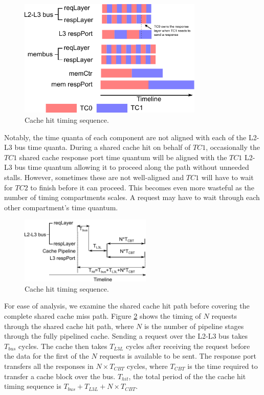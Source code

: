 \begin{figure}
    \begin{center}
        \includegraphics[width=3.46in]{figs/baseline_schedule.pdf}
        \caption{Cache hit timing sequence.}
        \label{fig:naive_scheme}
    \end{center}
\end{figure}

Notably, the time quanta of each component are not aligned with each of the 
L2-L3 bus time quanta.  During a shared cache hit on behalf of $TC1$, 
occasionally the $TC1$ shared cache response port time quantum will be aligned 
with the $TC1$ L2-L3 bus time quantum allowing it to proceed along the path 
without unneeded stalls.  However, sometimes these are not well-aligned and 
$TC1$ will have to wait for $TC2$ to finish before it can proceed. This becomes 
even more wasteful
as the number of timing compartments scales. A request may have to wait through 
each other compartment's time quantum. 

\begin{figure}
    \begin{center}
        \includegraphics[width=2.4675in]{figs/hit_timing.pdf}
        \caption{Cache hit timing sequence.}
        \label{fig:hit_timing}
    \end{center}
\end{figure}

For ease of analysis, we examine the shared cache hit path before covering the 
complete shared cache miss path. Figure \ref{fig:hit_timing} shows the timing 
of $N$ requests through the shared cache hit path, where $N$ is the number of 
pipeline stages through the fully pipelined cache. Sending a request over the 
L2-L3 bus takes $T_{bus}$ cycles.  The cache then takes $T_{L3L}$ cycles after 
receiving the request before the data for the first of the $N$ requests is 
available to be sent. The response port transfers all the responses in $N\times 
T_{CBT}$ cycles, where $T_{CBT}$ is the time required to transfer a cache block 
over the bus. $T_{hit}$, the total period of the the cache hit timing sequence 
is $T_{bus}+T_{L3L}+N\times T_{CBT}$.

